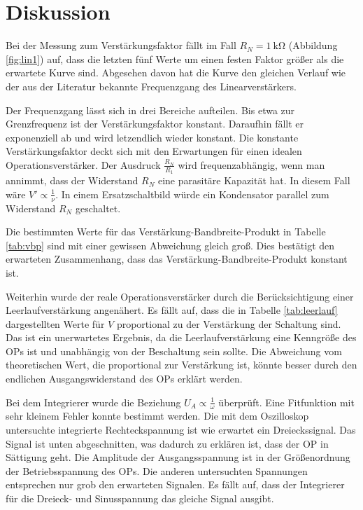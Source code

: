 \section{Diskussion}
Bei der Messung zum Verstärkungsfaktor fällt im Fall $R_N = \SI{1}{\kilo \ohm}$ (Abbildung \ref{fig:lin1}) auf, dass die letzten fünf Werte um einen festen Faktor größer als die erwartete Kurve sind.
Abgesehen davon hat die Kurve den gleichen Verlauf wie der aus der  Literatur bekannte Frequenzgang des Linearverstärkers.

Der Frequenzgang lässt sich in drei Bereiche aufteilen.
Bis etwa zur Grenzfrequenz ist der Verstärkungsfaktor konstant.
Daraufhin fällt er exponenziell ab und wird letzendlich wieder konstant.
Die konstante Verstärkungsfaktor deckt sich mit den Erwartungen für einen idealen Operationsverstärker.
Der Ausdruck $\frac{R_N}{R_1}$ wird frequenzabhängig, wenn man annimmt, dass der Widerstand $R_N$ eine parasitäre Kapazität hat.
In diesem Fall wäre $V' \propto \frac{1}{\nu}$.
In einem Ersatzschaltbild würde ein Kondensator parallel zum Widerstand $R_N$ geschaltet.

Die bestimmten Werte für das Verstärkung-Bandbreite-Produkt in Tabelle \ref{tab:vbp} sind mit einer gewissen Abweichung gleich groß.
Dies bestätigt den erwarteten Zusammenhang, dass das Verstärkung-Bandbreite-Produkt konstant ist.

Weiterhin wurde der reale Operationsverstärker durch die Berücksichtigung einer Leerlaufverstärkung angenähert.
Es fällt auf, dass die in Tabelle \ref{tab:leerlauf} dargestellten Werte für $V$ proportional zu der Verstärkung der Schaltung sind.
Das ist ein unerwartetes Ergebnis, da die Leerlaufverstärkung eine Kenngröße des OPs ist und unabhängig von der Beschaltung sein sollte.
Die Abweichung vom theoretischen Wert, die proportional zur Verstärkung ist, könnte besser durch den endlichen Ausgangswiderstand des OPs erklärt werden.

Bei dem Integrierer wurde die Beziehung $U_A \propto \frac{1}{\omega}$ überprüft.
Eine Fitfunktion mit sehr kleinem Fehler konnte bestimmt werden.
Die mit dem Oszilloskop untersuchte integrierte Rechteckspannung ist wie erwartet ein Dreieckssignal.
Das Signal ist unten abgeschnitten, was dadurch zu erklären ist, dass der OP in Sättigung geht.
Die Amplitude der Ausgangsspannung ist in der Größenordnung der Betriebsspannung des OPs.
Die anderen untersuchten Spannungen entsprechen nur grob den erwarteten Signalen.
Es fällt auf, dass der Integrierer für die Dreieck- und Sinusspannung das gleiche Signal ausgibt.

